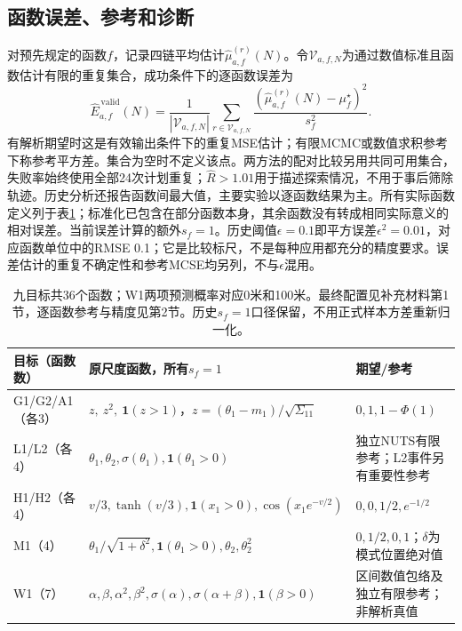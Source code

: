 \documentclass[UTF8,fontset=fandol,zihao=-4]{ctexart}
\newcommand{\ind}{\mathbf{1}}
\begin{document}
\subsection{函数误差、参考和诊断}
对预先规定的函数$f$，记录四链平均估计$\widehat\mu_{a,f}^{(r)}(N)$。令$\mathcal V_{a,f,N}$为通过数值标准且函数估计有限的重复集合，成功条件下的逐函数误差为
\begin{equation}\label{eq:error}
\widehat E^{\,\mathrm{valid}}_{a,f}(N)=\frac{1}{|\mathcal V_{a,f,N}|}\sum_{r\in\mathcal V_{a,f,N}}
\frac{(\widehat\mu_{a,f}^{(r)}(N)-\mu_f^\star)^2}{s_f^2}.
\end{equation}
有解析期望时这是有效输出条件下的重复MSE估计；有限MCMC或数值求积参考下称参考平方差。集合为空时不定义该点。两方法的配对比较另用共同可用集合，失败率始终使用全部24次计划重复；$\hat R>1.01$用于描述探索情况，不用于事后筛除轨迹。历史分析还报告函数间最大值，主要实验以逐函数结果为主。所有实际函数定义列于表\ref{tab:functions}；标准化已包含在部分函数本身，其余函数没有转成相同实际意义的相对误差。当前误差计算的额外$s_f=1$。历史阈值$\epsilon=0.1$即平方误差$\epsilon^2=0.01$，对应函数单位中的RMSE 0.1；它是比较标尺，不是每种应用都充分的精度要求。误差估计的重复不确定性和参考MCSE均另列，不与$\epsilon$混用。

\begin{table}[htbp]\centering\small
\begin{tabular}{>{\raggedright\arraybackslash}p{.15\linewidth}>{\raggedright\arraybackslash}p{.40\linewidth}>{\raggedright\arraybackslash}p{.33\linewidth}}\toprule
目标（函数数） & 原尺度函数，所有$s_f=1$ & 期望/参考\\\midrule
G1/G2/A1（各3） & $z,\ z^2,\ \ind(z>1)$，$z=(\theta_1-m_1)/\sqrt{\Sigma_{11}}$ & $0,1,1-\Phi(1)$\\
L1/L2（各4） & $\theta_1,\theta_2,\sigma(\theta_1),\ind(\theta_1>0)$ & 独立NUTS有限参考；L2事件另有重要性参考\\
H1/H2（各4） & $v/3,\tanh(v/3),\ind(x_1>0),\cos(x_1e^{-v/2})$ & $0,0,1/2,e^{-1/2}$\\
M1（4） & $\theta_1/\sqrt{1+\delta^2},\ind(\theta_1>0),\theta_2,\theta_2^2$ & $0,1/2,0,1$；$\delta$为模式位置绝对值\\
W1（7） & $\alpha,\beta,\alpha^2,\beta^2,\sigma(\alpha),\sigma(\alpha+\beta),\ind(\beta>0)$ & 区间数值包络及独立有限参考；非解析真值\\\bottomrule
\end{tabular}
\caption{九目标共36个函数；W1两项预测概率对应0米和100米。最终配置见补充材料第1节，逐函数参考与精度见第2节。历史$s_f=1$口径保留，不用正式样本方差重新归一化。}
\label{tab:functions}
\end{table}
\end{document}
